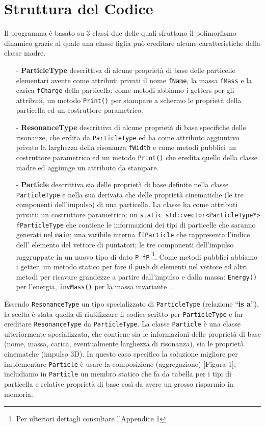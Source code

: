 \documentclass[a4paper,10 pt]{article}
\begin{document}
\section{Struttura del Codice}
Il programma è basato su 3 classi due delle quali sfruttano il polimorfismo dinamico grazie 
al quale una classe figlia può ereditare alcune caratteristiche della classe madre.
\begin{itemize}
    \item[-] {\bf ParticleType} descrittiva di alcune proprietà di base delle particelle elementari avente come 
    attributi privati il nome \verb!fName!, la massa \verb!fMass! e la carica \verb!fCharge! della particella; 
    come metodi abbiamo i getters per gli attributi, un metodo \verb!Print()! per stampare a schermo 
    le proprietà della particella ed un costruttore parametrico.

    \item[-] {\bf ResonanceType} descrittiva di alcune proprietà di base specifiche delle risonanze, che erdita 
    da \verb!ParticleType! ed ha come attributo aggiuntivo privato la larghezza della risonanza \verb!fWidth! e 
    come metodi pubblici un costruttore parametrico ed un metodo \verb!Print()! che eredita quello della classe madre ed aggiunge un attributo 
    da stampare.

    \item[-] {\bf Particle} descrittiva sia delle proprietà di base definite nella classe \verb!ParticleType! e nella
    sua derivata che delle proprietà cinematiche (le tre componenti dell'impulso) di una particella. La classe ha come attributi
    privati: un costruttore parametrico;
    un \verb!static std::vector<ParticleType*> fParticleType! che contiene le informazioni dei tipi di particelle
    che saranno generati nel \verb!main!; una varibile interna \verb!fIParticle! che rappresenta l'indice dell'
    elemento del vettore di puntatori; le tre componenti dell'impulso raggruppate in un nuovo tipo di dato \verb!P fP! \footnote{Per ulteriori dettagli consultare l'Appendice 1}. 
    Come metodi pubblici abbiamo i getter, un metodo statico per fare il \verb!push! di elementi nel vettore ed altri metodi per ricavare grandezze a partire
    dall'impulso e dalla massa: \verb!Energy()! per l'energia, \verb!invMass()! per la massa invariante $\dots$
\end{itemize} 

Essendo \verb!ResonanceType! un tipo specializzato di \verb!ParticleType! (relazione “{\bf is a}”), la scelta è stata quella di riutilizzare il codice scritto per \verb!ParticleType! e far ereditare 
\verb!ResonanceType! da \verb!ParticleType!. La classe \verb!Particle! è una classe ulteriormente specializzata, che contiene sia le informazioni delle proprietà di base (nome, massa, carica, eventualmente larghezza di risonanza),
sia le proprietà cinematche (impulso 3D). In questo caso specifico la soluzione migliore per implementare \verb!Particle! è usare la composizione (aggregazione) [Figura-1]; includiamo in \verb!Particle! un membro statico che fa da tabella 
per i tipi di particella e relative proprietà di base così da avere un grosso risparmio in memoria.
\end{document}
